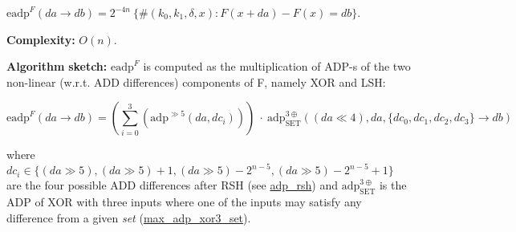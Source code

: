 $\mathrm{eadp}^{F}(da \rightarrow db) = 2^{-4n}~\{\#(k_0,k_1,\delta,x) : F(x + da) - F(x) = db\}$.

{\bfseries \-Complexity\-:} $O(n)$.

{\bfseries \-Algorithm} {\bfseries sketch\-:} $\mathrm{eadp}^{F}$ is computed as the multiplication of \-A\-D\-P-\/s of the two non-\/linear (w.\-r.\-t. \-A\-D\-D differences) components of \-F, namely \-X\-O\-R and \-L\-S\-H\-:

\[\mathrm{eadp}^{F}(da \rightarrow db) = (\sum^3_{i=0} (\mathrm{adp}^{\gg 5}(da, dc_i)))~ \cdot~ \mathrm{adp}^{3\oplus}_{\mathrm{SET}}((da \ll 4), da, \{dc_0, dc_1, dc_2, dc_3\} \rightarrow db)\]

where $dc_i \in \{(da \gg 5), (da \gg 5) + 1, (da \gg 5) - 2^{n-5}, (da \gg 5) - 2^{n-5} + 1\}$ are the four possible \-A\-D\-D differences after \-R\-S\-H (see \hyperlink{adp-shift_8hh_a06fffd781af6662482922889bc562caf}{adp\-\_\-rsh}) and $\mathrm{adp}^{3\oplus}_{\mathrm{SET}}$ is the \-A\-D\-P of \-X\-O\-R with three inputs where one of the inputs may satisfy any difference from a given {\itshape set\/} (\hyperlink{max-adp-xor3-set_8hh_a64619e5349dd07dc017b0469b4066fce}{max\-\_\-adp\-\_\-xor3\-\_\-set}).


